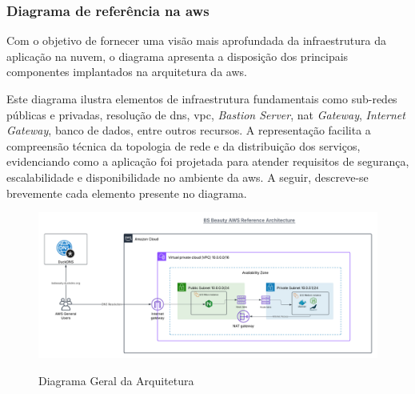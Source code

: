 \subsubsection{Diagrama de referência na \gls{aws}}

Com o objetivo de fornecer uma visão mais aprofundada da infraestrutura da aplicação na nuvem, o diagrama apresenta a disposição dos principais componentes implantados na arquitetura da \gls{aws}.

Este diagrama ilustra elementos de infraestrutura fundamentais como sub-redes públicas e privadas, resolução de \gls{dns}, \gls{vpc}, \emph{Bastion Server}, \gls{nat} \emph{Gateway}, \emph{Internet Gateway}, banco de dados, entre outros recursos. A representação facilita a compreensão técnica da topologia de rede e da distribuição dos serviços, evidenciando como a aplicação foi projetada para atender requisitos de segurança, escalabilidade e disponibilidade no ambiente da \gls{aws}. A seguir, descreve-se brevemente cada elemento presente no diagrama.

\begin{figure}[htb]
  \centering
  \caption{Diagrama Geral da Arquitetura}
  \includegraphics[width=\textwidth]{cap04-desenvolvimento/images/4-3-2-3-diagrama-geral}
  \label{fig:diagrama-geral}
\end{figure}
\FloatBarrier

